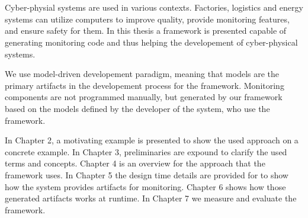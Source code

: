 \chapter{\bevezetes}

Cyber-physial systems are used in various contexts. Factories, logistics and energy systems can utilize computers to improve quality, provide monitoring features, and ensure safety for them. In this thesis a framework is presented capable of generating monitoring code and thus helping the developement of cyber-physical systems. 

We use model-driven developement paradigm, meaning that models are the primary artifacts in the developement process for the framework. Monitoring components are not programmed manually, but generated by our framework based on the models defined by the developer of the system, who use the framework. 

In Chapter 2, a motivating example is presented to show the used approach on a concrete example. In Chapter 3, preliminaries are expound to clarify the used terms and concepts. Chapter 4 is an overview for the approach that the framework uses. In Chapter 5 the design time details are provided for to show how the system provides artifacts for monitoring. Chapter 6 shows how those generated artifacts works at runtime. In Chapter 7 we measure and evaluate the framework.